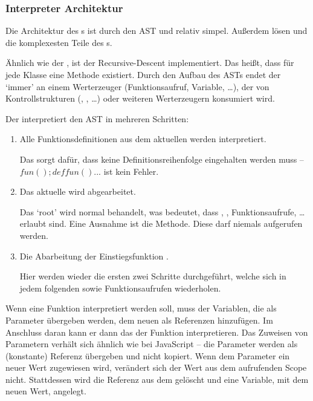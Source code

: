     \subsubsection{Interpreter Architektur}
    \label{sssec:Interpreter Architektur}
      Die Architektur des s ist durch den AST und  relativ simpel. Außerdem lösen  und  die komplexesten Teile des s.

      Ähnlich wie der , ist der  Recursive-Descent implementiert. Das heißt, dass für jede  Klasse eine  Methode existiert. Durch den Aufbau des ASTs endet der  `immer' an einem Werterzeuger (Funktionsaufruf, Variable, \ldots), der von Kontrollstrukturen (, , \ldots) oder weiteren Werterzeugern konsumiert wird.

      Der  interpretiert den AST in mehreren Schritten:
      \begin{enumerate}
        \item Alle Funktionsdefinitionen aus dem aktuellen  werden interpretiert.

          Das sorgt dafür, dass keine Definitionsreihenfolge eingehalten werden muss -- \myMIn$fun(); def fun() {...}$ ist kein Fehler.
        \item Das aktuelle  wird abgearbeitet.

          Das `root'  wird normal behandelt, was bedeutet, dass , , Funktionsaufrufe, \ldots{} erlaubt sind. Eine Ausnahme ist die  Methode. Diese darf niemals aufgerufen werden.
        \item Die Abarbeitung der Einstiegsfunktion .

          Hier werden wieder die ersten zwei Schritte durchgeführt, welche sich in jedem folgenden  sowie Funktionsaufrufen wiederholen.
      \end{enumerate}

      Wenn eine Funktion interpretiert werden soll, muss der  Variablen, die als Parameter übergeben werden, dem neuen  als Referenzen hinzufügen. Im Anschluss daran kann er dann das  der Funktion interpretieren. Das Zuweisen von Parametern verhält sich ähnlich wie bei JavaScript -- die Parameter werden als (konstante) Referenz übergeben und nicht kopiert. Wenn dem Parameter ein neuer Wert zugewiesen wird, verändert sich der Wert aus dem aufrufenden Scope nicht. Stattdessen wird die Referenz aus dem  gelöscht und eine Variable, mit dem neuen Wert, angelegt.

